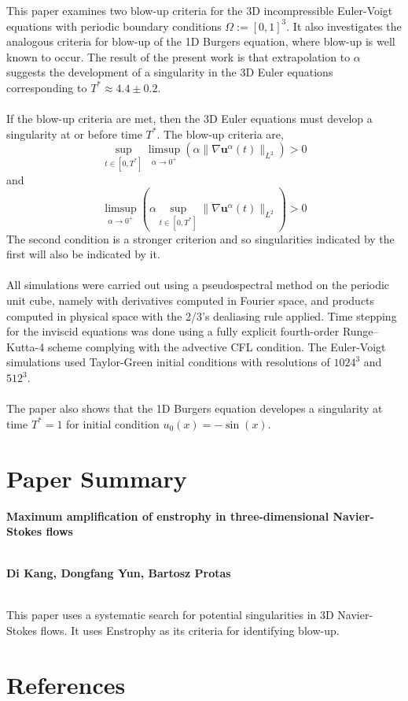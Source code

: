 \documentclass[12pt]{article}
\begin{document}
\begin{flushleft}
\qquad This paper examines two blow-up criteria for the 3D incompressible Euler-Voigt equations with periodic boundary conditions $\Omega := [0,1]^3$. It also investigates the analogous criteria for blow-up of the 1D Burgers equation, where blow-up is well known to occur. The result of the present work is that extrapolation to $\alpha$ suggests the development of a singularity in the 3D Euler equations corresponding to $T^* \approx 4.4 \pm 0.2$.
\\~\\
If the blow-up criteria are met, then the 3D Euler equations must develop a singularity at or before time $T^*$. The blow-up criteria are,
$$\sup_{t\in[0,T^*]}\limsup_{\alpha\rightarrow 0^+}(\alpha\|\nabla\textbf{u}^\alpha(t)\|_{L^2}) > 0$$
and
$$\limsup_{\alpha\rightarrow 0^+} \left( \alpha \sup_{t\in [0,T^*]}\|\nabla\textbf{u}^\alpha(t)\|_{L^2} \right) > 0$$
The second condition is a stronger criterion and so singularities indicated by the first will also be indicated by it.
\\~\\
\qquad All simulations were carried out using a pseudospectral method on the periodic unit cube, namely with derivatives computed in Fourier space, and products computed in physical space with the 2/3’s dealiasing rule applied. Time stepping for the inviscid equations was done using a fully explicit fourth-order Runge–Kutta-4 scheme complying with the advective CFL condition. The Euler-Voigt simulations used Taylor-Green initial conditions with resolutions of $1024^3$ and $512^3$.
\\~\\
The paper also shows that the 1D Burgers equation developes a singularity at time $T^*=1$ for initial condition $u_0(x) = -\sin(x)$.

\section{Paper Summary}
\begin{center}
\begin{large}
\textbf{Maximum amplification of enstrophy in three-dimensional Navier-Stokes flows}
\\~\\
\end{large}
\textbf{Di Kang, Dongfang Yun, Bartosz Protas}
\\~\\
\end{center}
\qquad This paper uses a systematic search for potential singularities in 3D Navier-Stokes flows. It uses Enstrophy as its criteria for identifying blow-up.

\section{References}

\end{flushleft}
\end{document}
